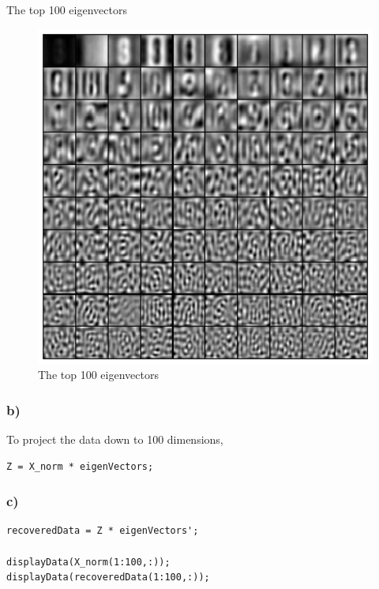 The top 100 eigenvectors

\begin{figure}[!ht]
\includegraphics[width=1\textwidth]{chapters/images/figure-3-7-b}
\caption{The top 100 eigenvectors}
\end{figure}

\subsubsection{b)}

To project the data down to 100 dimensions, 

\begin{lstlisting}[caption=Problem 3.7 b)]
Z = X_norm * eigenVectors;
\end{lstlisting}



\subsubsection{c)}

\begin{lstlisting}[caption=Problem 3.7 c)]
recoveredData = Z * eigenVectors';

displayData(X_norm(1:100,:));
displayData(recoveredData(1:100,:));
\end{lstlisting}


